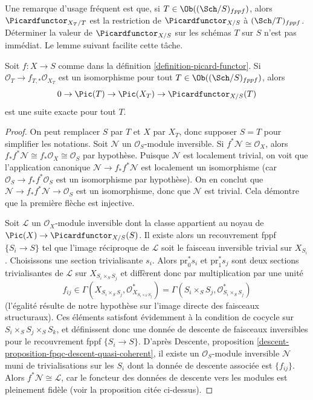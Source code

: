 \noindent
Une remarque d'usage fréquent est que, si $T \in \Ob((\Sch/S)_{fppf})$, alors
$\Picardfunctor_{X_T/T}$ est la restriction de $\Picardfunctor_{X/S}$ à
$(\Sch/T)_{fppf}$.
Déterminer la valeur de $\Picardfunctor_{X/S}$ sur les schémas
$T$ sur $S$ n'est pas immédiat. Le lemme suivant facilite cette
tâche.

\begin{lemma}
\label{lemma-flat-geometrically-connected-fibres}
Soit $f : X \to S$ comme dans la définition \ref{definition-picard-functor}.
Si $\mathcal{O}_T \to f_{T, *}\mathcal{O}_{X_T}$ est un isomorphisme
pour tout $T \in \Ob((\Sch/S)_{fppf})$, alors
$$
0 \to \Pic(T) \to \Pic(X_T) \to \Picardfunctor_{X/S}(T)
$$
est une suite exacte pour tout $T$.
\end{lemma}

\begin{proof}
On peut remplacer $S$ par $T$ et $X$ par $X_T$, donc supposer $S = T$
pour simplifier les notations. Soit $\mathcal{N}$ un
$\mathcal{O}_S$-module inversible. Si $f^*\mathcal{N} \cong \mathcal{O}_X$, alors
$f_*f^*\mathcal{N} \cong f_*\mathcal{O}_X \cong \mathcal{O}_S$
par hypothèse. Puisque $\mathcal{N}$ est localement trivial, on voit que
l'application canonique $\mathcal{N} \to f_*f^*\mathcal{N}$ est localement
un isomorphisme (car $\mathcal{O}_S \to f_*f^*\mathcal{O}_S$
est un isomorphisme par hypothèse). On en conclut que
$\mathcal{N} \to f_*f^*\mathcal{N} \to \mathcal{O}_S$ est un isomorphisme,
donc que $\mathcal{N}$ est trivial. Cela démontre que la première flèche
est injective.

\medskip\noindent
Soit $\mathcal{L}$ un $\mathcal{O}_X$-module inversible dont la classe appartient
au noyau de $\Pic(X) \to \Picardfunctor_{X/S}(S)$. Il existe alors
un recouvrement fppf $\{S_i \to S\}$ tel que l'image réciproque de $\mathcal{L}$
soit le faisceau inversible trivial sur $X_{S_i}$. Choisissons une section
trivialisante $s_i$. Alors $\text{pr}_0^*s_i$ et $\text{pr}_1^*s_j$ sont deux
sections trivialisantes de $\mathcal{L}$ sur $X_{S_i \times_S S_j}$
et diffèrent donc par multiplication par une unité
$$
f_{ij} \in
\Gamma(X_{S_i \times_S S_j}, \mathcal{O}_{X_{S_i \times_S S_j}}^*) =
\Gamma(S_i \times_S S_j, \mathcal{O}_{S_i \times_S S_j}^*)
$$
(l'égalité résulte de notre hypothèse sur l'image directe des faisceaux structuraux).
Ces éléments satisfont évidemment à la condition de cocycle sur
$S_i \times_S S_j \times_S S_k$, et définissent donc une donnée de descente
de faisceaux inversibles pour le recouvrement fppf $\{S_i \to S\}$.
D'après Descente, proposition \ref{descent-proposition-fpqc-descent-quasi-coherent},
il existe un $\mathcal{O}_S$-module inversible $\mathcal{N}$
muni de trivialisations sur les $S_i$ dont la donnée de descente associée est
$\{f_{ij}\}$. Alors $f^*\mathcal{N} \cong \mathcal{L}$, car le
foncteur des données de descente vers les modules est pleinement fidèle (voir la proposition
citée ci-dessus).
\end{proof}

